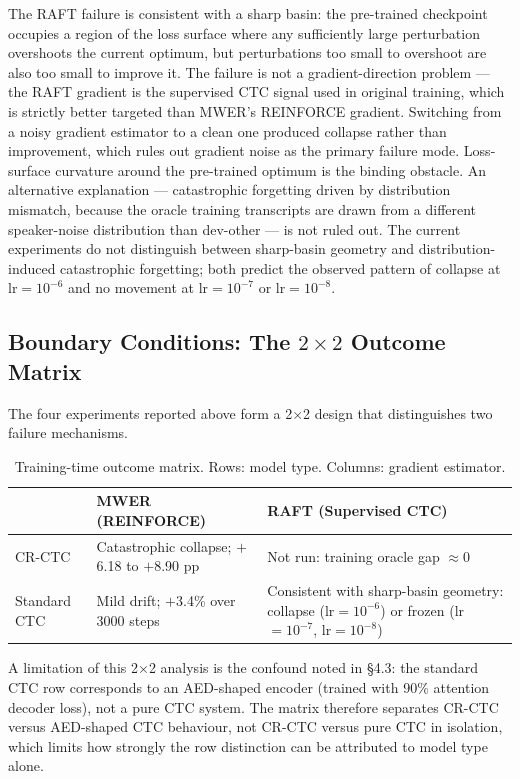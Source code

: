 The RAFT failure is consistent with a sharp basin: the pre-trained checkpoint occupies a region of the loss surface where any sufficiently large perturbation overshoots the current optimum, but perturbations too small to overshoot are also too small to improve it. The failure is not a gradient-direction problem — the RAFT gradient is the supervised CTC signal used in original training, which is strictly better targeted than MWER's REINFORCE gradient. Switching from a noisy gradient estimator to a clean one produced collapse rather than improvement, which rules out gradient noise as the primary failure mode. Loss-surface curvature around the pre-trained optimum is the binding obstacle. An alternative explanation — catastrophic forgetting driven by distribution mismatch, because the oracle training transcripts are drawn from a different speaker-noise distribution than dev-other — is not ruled out. The current experiments do not distinguish between sharp-basin geometry and distribution-induced catastrophic forgetting; both predict the observed pattern of collapse at lr$=10^{-6}$ and no movement at lr$=10^{-7}$ or lr$=10^{-8}$.



\subsection{Boundary Conditions: The $2\times2$ Outcome Matrix}

The four experiments reported above form a 2$\times$2 design that distinguishes two failure mechanisms.

\begin{table}[t]
\centering
\caption{Training-time outcome matrix. Rows: model type. Columns: gradient estimator.}
\label{tab:outcome-matrix}
\begin{tabular}{lp{5.2cm}p{5.8cm}}
\hline
 & MWER (REINFORCE) & RAFT (Supervised CTC) \\
\hline
CR-CTC & Catastrophic collapse; $+$6.18 to $+$8.90 pp & Not run: training oracle gap $\approx 0$ \\
Standard CTC & Mild drift; $+$3.4\% over 3000 steps & Consistent with sharp-basin geometry: collapse (lr$=10^{-6}$) or frozen (lr$=10^{-7}$, lr$=10^{-8}$) \\
\hline
\end{tabular}
\end{table}

A limitation of this 2$\times$2 analysis is the confound noted in §4.3: the standard CTC row corresponds to an AED-shaped encoder (trained with 90\% attention decoder loss), not a pure CTC system. The matrix therefore separates CR-CTC versus AED-shaped CTC behaviour, not CR-CTC versus pure CTC in isolation, which limits how strongly the row distinction can be attributed to model type alone.

